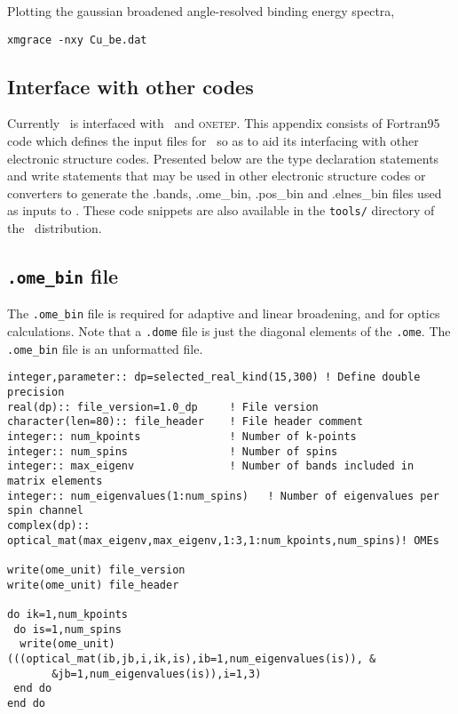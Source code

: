 \documentclass[a4paper,11pt,twoside]{book}
\begin{document}
Plotting the gaussian broadened angle-resolved binding energy spectra,

\verb#xmgrace -nxy Cu_be.dat#

\begin{appendix}

\chapter{Interface with other codes}
Currently \optados\ is interfaced with \castep\ and \textsc{onetep}.
%
This appendix consists of Fortran95 code which defines the input files for \optados\ so as to aid its interfacing with other electronic structure codes.
%
Presented below are the type declaration statements and write statements that may be used in other electronic structure codes or converters to generate the .bands, .ome\_bin, .pos\_bin and .elnes\_bin files used as inputs to \optados.
%
These code snippets are also available in the \texttt{tools/} directory of the \optados\ distribution.

\section{\texttt{.ome\_bin} file}
The \texttt{.ome\_bin} file is required for adaptive and linear broadening, and for optics calculations.
%
Note that a \texttt{.dome} file is just the diagonal elements of the \texttt{.ome}.
%
The \texttt{.ome\_bin} file is an unformatted file.
\begin{verbatim}
integer,parameter:: dp=selected_real_kind(15,300) ! Define double precision
real(dp):: file_version=1.0_dp     ! File version
character(len=80):: file_header    ! File header comment
integer:: num_kpoints              ! Number of k-points
integer:: num_spins                ! Number of spins
integer:: max_eigenv               ! Number of bands included in matrix elements
integer:: num_eigenvalues(1:num_spins)   ! Number of eigenvalues per spin channel
complex(dp):: optical_mat(max_eigenv,max_eigenv,1:3,1:num_kpoints,num_spins)! OMEs

write(ome_unit) file_version
write(ome_unit) file_header

do ik=1,num_kpoints
 do is=1,num_spins
  write(ome_unit) (((optical_mat(ib,jb,i,ik,is),ib=1,num_eigenvalues(is)), &
       &jb=1,num_eigenvalues(is)),i=1,3)
 end do
end do
\end{verbatim}


\end{appendix}
\end{document}
